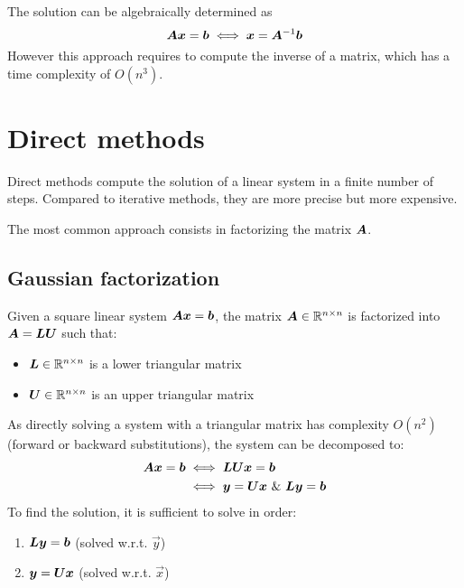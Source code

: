 The solution can be algebraically determined as 
\[ {\bm{A}}{\bm{x}} = {\bm{b}} \iff {\bm{x}} = {\bm{A}}^{-1}{\bm{b}} \]
However this approach requires to compute the inverse of a matrix, which has a time complexity of $O(n^3)$.



\section{Direct methods}
Direct methods compute the solution of a linear system in a finite number of steps.
Compared to iterative methods, they are more precise but more expensive.

The most common approach consists in factorizing the matrix ${\bm{A}}$.

\subsection{Gaussian factorization}
Given a square linear system ${\bm{A}}{\bm{x}} = {\bm{b}}$, 
the matrix ${\bm{A}} \in \mathbb{R}^{n \times n}$ is factorized into ${\bm{A}} = {\bm{L}}{\bm{U}}$ such that:
\begin{itemize}
    \item ${\bm{L}} \in \mathbb{R}^{n \times n}$ is a lower triangular matrix
    \item ${\bm{U}} \in \mathbb{R}^{n \times n}$ is an upper triangular matrix
\end{itemize}
%
As directly solving a system with a triangular matrix has complexity $O(n^2)$ (forward or backward substitutions), 
the system can be decomposed to:
\begin{equation}
    \begin{split}
        {\bm{A}}{\bm{x}} = {\bm{b}} & \iff {\bm{LU}}{\bm{x}} = {\bm{b}} \\
            & \iff {\bm{y}} = {\bm{U}}{\bm{x}} \text{ \& } {\bm{L}}{\bm{y}} = {\bm{b}}
    \end{split}
\end{equation}
To find the solution, it is sufficient to solve in order:
\begin{enumerate}
    \item ${\bm{L}}{\bm{y}} = {\bm{b}}$ (solved w.r.t. $\vec{y}$)
    \item ${\bm{y}} = {\bm{U}}{\bm{x}}$ (solved w.r.t. $\vec{x}$)
\end{enumerate}

